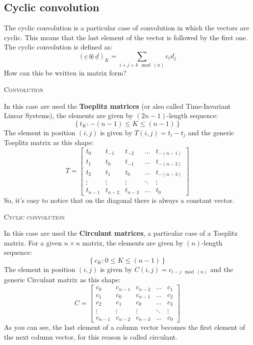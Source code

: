 \subsection{Cyclic convolution}
The cyclic convolution is a particular case of convolution in which the vectors are cyclic. This means that the last element of the vector is followed by the first one. The cyclic convolution is defined as:
\[
    (\underline{c}\circledast \underline{d})_K = \sum_{i+j = k \mod(n)} c_i d_j 
\]
How can this be written in matrix form?
\begin{multicols}{2}
    \begin{center}
        \textsc{Convolution}
    \end{center}
    In this case are used the \textbf{Toeplitz matrices} (or also called Time-Invariant Linear Systems), the elements are given by $(2n - 1)$-length sequence:
    \[
        \left\{t_K: -(n-1) \leq K \leq (n-1) \right\}    
    \]
    The element in position $(i,j)$ is given by $T(i,j) = t_i - t_j$ and the generic Toeplitz matrix as this shape:
    \[
        T = \begin{bmatrix}
            t_0 & t_{-1} & t_{-2} & \dots & t_{-(n-1)} \\
            t_1 & t_0 & t_{-1} & \dots & t_{-(n-2)} \\
            t_2 & t_1 & t_0 & \dots & t_{-(n-3)} \\
            \vdots & \vdots & \vdots & \ddots & \vdots \\
            t_{n-1} & t_{n-2} & t_{n-3} & \dots & t_0
        \end{bmatrix}    
    \]
    So, it's easy to notice that on the diagonal there is always a constant vector.
    \newcolumn
    \begin{center}
        \textsc{Cyclic convolution}
    \end{center}
    In this case are used the \textbf{Circulant matrices}, a particular case of a Toeplitz matrix. For a given $n \times n$ matrix, the elements are given by $(n)$-length sequence:
    \[
        \left\{c_K: 0 \leq K \leq (n-1) \right\}
    \]
    The element in position $(i,j)$ is given by $C(i,j) = c_{i-j \mod(n)}$ and the generic Circulant matrix as this shape:
    \[
        C = \begin{bmatrix}
            c_0 & c_{n-1} & c_{n-2} & \dots & c_1 \\
            c_1 & c_0 & c_{n-1} & \dots & c_2 \\
            c_2 & c_1 & c_0 & \dots & c_3 \\
            \vdots & \vdots & \vdots & \ddots & \vdots \\
            c_{n-1} & c_{n-2} & c_{n-3} & \dots & c_0
        \end{bmatrix}
    \]
    As you can see, the last element of a column vector becomes the first element of the next column vector, for this reason is called circulant. 
\end{multicols}
